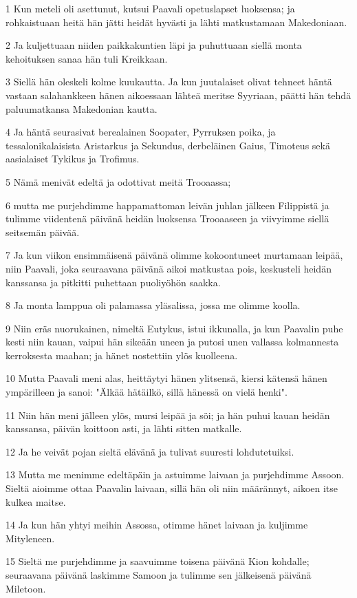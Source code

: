 \par 1 Kun meteli oli asettunut, kutsui Paavali opetuslapset luoksensa; ja rohkaistuaan heitä hän jätti heidät hyvästi ja lähti matkustamaan Makedoniaan.
\par 2 Ja kuljettuaan niiden paikkakuntien läpi ja puhuttuaan siellä monta kehoituksen sanaa hän tuli Kreikkaan.
\par 3 Siellä hän oleskeli kolme kuukautta. Ja kun juutalaiset olivat tehneet häntä vastaan salahankkeen hänen aikoessaan lähteä meritse Syyriaan, päätti hän tehdä paluumatkansa Makedonian kautta.
\par 4 Ja häntä seurasivat berealainen Soopater, Pyrruksen poika, ja tessalonikalaisista Aristarkus ja Sekundus, derbeläinen Gaius, Timoteus sekä aasialaiset Tykikus ja Trofimus.
\par 5 Nämä menivät edeltä ja odottivat meitä Trooaassa;
\par 6 mutta me purjehdimme happamattoman leivän juhlan jälkeen Filippistä ja tulimme viidentenä päivänä heidän luoksensa Trooaaseen ja viivyimme siellä seitsemän päivää.
\par 7 Ja kun viikon ensimmäisenä päivänä olimme kokoontuneet murtamaan leipää, niin Paavali, joka seuraavana päivänä aikoi matkustaa pois, keskusteli heidän kanssansa ja pitkitti puhettaan puoliyöhön saakka.
\par 8 Ja monta lamppua oli palamassa yläsalissa, jossa me olimme koolla.
\par 9 Niin eräs nuorukainen, nimeltä Eutykus, istui ikkunalla, ja kun Paavalin puhe kesti niin kauan, vaipui hän sikeään uneen ja putosi unen vallassa kolmannesta kerroksesta maahan; ja hänet nostettiin ylös kuolleena.
\par 10 Mutta Paavali meni alas, heittäytyi hänen ylitsensä, kiersi kätensä hänen ympärilleen ja sanoi: "Älkää hätäilkö, sillä hänessä on vielä henki".
\par 11 Niin hän meni jälleen ylös, mursi leipää ja söi; ja hän puhui kauan heidän kanssansa, päivän koittoon asti, ja lähti sitten matkalle.
\par 12 Ja he veivät pojan sieltä elävänä ja tulivat suuresti lohdutetuiksi.
\par 13 Mutta me menimme edeltäpäin ja astuimme laivaan ja purjehdimme Assoon. Sieltä aioimme ottaa Paavalin laivaan, sillä hän oli niin määrännyt, aikoen itse kulkea maitse.
\par 14 Ja kun hän yhtyi meihin Assossa, otimme hänet laivaan ja kuljimme Mityleneen.
\par 15 Sieltä me purjehdimme ja saavuimme toisena päivänä Kion kohdalle; seuraavana päivänä laskimme Samoon ja tulimme sen jälkeisenä päivänä Miletoon.
